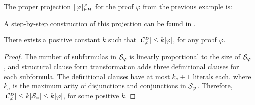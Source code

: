 \begin{example}
\label{example:DProjectionProper}
The proper projection $\projectionProper{\varphi}{\seq H }$ for the proof $\varphi$ from the previous example is:
\begin{scriptsize}
\begin{prooftree}
		 
	 
	 
				 
						 
						 
					 
					 
					 
			 
									 
										 
								  
								 
					  
					 
\end{prooftree}
\end{scriptsize}

\noindent
A step-by-step construction of this projection can be found in \cite{Woltzenlogel-Paleo2009A-General-Analysis-of-Cut-Elimination-by-CERes}.
\hfill\QED
\end{example}

\begin{theorem}
\label{theorem:SizeOfDefinitionalClauseSets}
There exists a positive constant $k$ such that $|\clausesetDefinitional{\varphi}| \leq k \proofsizeSymbol{\varphi}$, for any proof $\varphi$.
\end{theorem}
\begin{proof}
The number of subformulas in $\struct{\varphi}$ is linearly proportional to the size of $\struct{\varphi}$, and structural clause form transformation adds three definitional clauses for each subformula. The definitional clauses have at most $k_a + 1$ literals each, where $k_a$ is the maximum arity of disjunctions and conjunctions in $\struct{\varphi}$. Therefore, $|\clausesetDefinitional{\varphi}| \leq k |\struct{\varphi}| \leq k \proofsizeSymbol{\varphi}$, for some positive $k$.
\hfill\QED
\end{proof}

